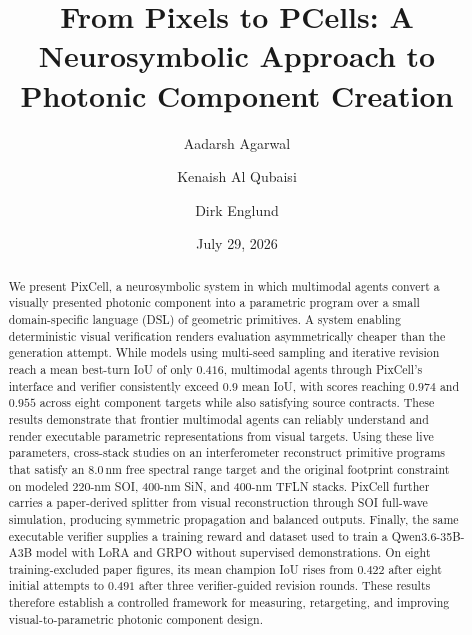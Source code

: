\documentclass[%
 reprint,
 superscriptaddress,
 amsmath,amssymb,
 aps,
 pra,
 longbibliography,
 floatfix,
]{revtex4-2}
\begin{document}
\title{From Pixels to PCells: A Neurosymbolic Approach to Photonic Component Creation}

\author{Aadarsh Agarwal}

\author{Kenaish Al Qubaisi}

\author{Dirk Englund}

\date{July 29, 2026}

\begin{abstract}
We present PixCell, a neurosymbolic system in which multimodal agents convert
a visually presented photonic component into a parametric program over a small
domain-specific language (DSL) of geometric primitives. A system enabling
deterministic visual verification renders evaluation asymmetrically cheaper
than the generation attempt. While models using multi-seed sampling and
iterative revision reach a mean best-turn IoU of only $0.416$, multimodal
agents through PixCell's interface and verifier consistently exceed $0.9$ mean
IoU, with scores reaching $0.974$ and $0.955$ across eight component targets
while also satisfying source contracts. These results demonstrate that frontier
multimodal agents can reliably understand and render executable parametric
representations from visual targets. Using these live parameters, cross-stack
studies on an interferometer reconstruct primitive programs that satisfy an
$8.0$\,nm free spectral range target and the original footprint constraint on
modeled 220-nm SOI, 400-nm SiN, and 400-nm TFLN stacks. PixCell further carries
a paper-derived splitter from visual reconstruction through SOI full-wave
simulation, producing symmetric propagation and balanced outputs. Finally, the
same executable verifier supplies a training reward and dataset used to train a
Qwen3.6-35B-A3B model with LoRA and GRPO without supervised demonstrations. On
eight training-excluded paper figures, its mean champion IoU rises from
$0.422$ after eight initial attempts to $0.491$ after three verifier-guided
revision rounds. These results therefore establish a controlled framework for
measuring, retargeting, and improving visual-to-parametric photonic component
design.
\end{abstract}
\end{document}

